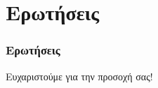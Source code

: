 \section{Ερωτήσεις}
\begin{frame}
	\frametitle{Ερωτήσεις}
	\centering
	\Huge Ευχαριστούμε για την προσοχή σας!
\end{frame}
